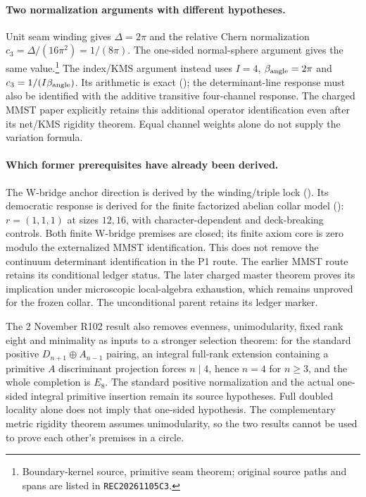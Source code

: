 \paragraph{Two normalization arguments with different hypotheses.}
Unit seam winding gives $\Delta=2\pi$ and the relative Chern normalization
$c_3=\Delta/(16\pi^2)=1/(8\pi)$. The one-sided normal-sphere argument
gives the same value.\footnote{Boundary-kernel source, primitive seam theorem; original source paths and spans are listed in \texttt{REC20261105C3}.} The index/KMS argument instead uses
$I=4$, $\beta_{\rm angle}=2\pi$ and
$c_3=1/(I\beta_{\rm angle})$. Its arithmetic is exact
(); the determinant-line response must
also be identified with the additive transitive four-channel response.
The charged MMST paper explicitly retains this additional operator
identification even after its net/KMS rigidity theorem. Equal channel
weights alone do not supply the variation formula.

\paragraph{Which former prerequisites have already been derived.}
The W-bridge anchor direction is derived by the winding/triple lock
(). Its democratic response is
derived for the finite factorized abelian collar model
(): $r=(1,1,1)$ at sizes $12,16$,
with character-dependent and deck-breaking controls. Both finite W-bridge
premises are closed; its finite axiom core is zero modulo the externalized
MMST identification. This does not remove the continuum determinant
identification in the P1 route. The earlier MMST route retains its conditional ledger status. The later
charged master theorem proves its implication under microscopic local-algebra
exhaustion, which remains unproved for the frozen collar. The unconditional
parent retains its ledger marker.

The 2 November R102 result also removes evenness, unimodularity, fixed
rank eight and minimality as inputs to a stronger selection theorem:
for the standard positive $D_{n+1}\oplus A_{n-1}$ pairing, an integral
full-rank extension containing a primitive $A$ discriminant projection
forces $n\mid4$, hence $n=4$ for $n\ge3$, and the whole completion is
$E_8$. The standard positive normalization and the actual one-sided
integral primitive insertion remain its source hypotheses. Full doubled
locality alone does not imply that one-sided hypothesis. The complementary
metric rigidity theorem assumes unimodularity, so the two results cannot
be used to prove each other's premises in a circle.

